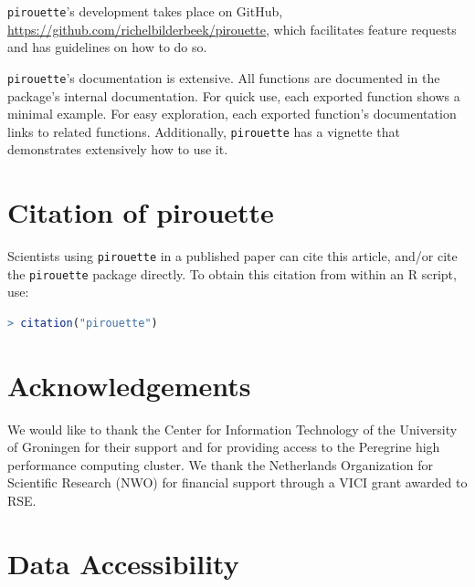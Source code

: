 \documentclass{article}
\begin{document}
\verb;pirouette;'s development takes place on GitHub,
\url{https://github.com/richelbilderbeek/pirouette}, 
which facilitates feature requests and 
has guidelines on how to do so.

\verb;pirouette;'s documentation is extensive. All functions are documented in the package's internal documentation. For quick use, 
each exported function shows a minimal example. 
For easy exploration, each exported function's documentation links to related functions.
Additionally, \verb;pirouette; has a vignette that demonstrates extensively how to use it. 

\section{Citation of pirouette}

Scientists using \verb;pirouette; in a published paper can cite this
article, and/or cite the \verb;pirouette; package 
directly. To obtain this citation from within an R script, use:

\begin{lstlisting}[language=R]
> citation("pirouette")
\end{lstlisting}

\section{Acknowledgements}

We would like to thank the Center for Information Technology of the University 
of Groningen for their support and for providing access to the Peregrine 
high performance computing cluster. 
We thank the Netherlands 
Organization for Scientific Research (NWO) for financial support 
through a VICI grant awarded to RSE.

\section{Data Accessibility}
\end{document}
